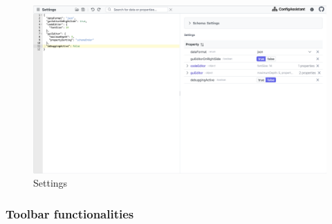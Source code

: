 \begin{figure}[h]
    \includegraphics[width=\textwidth]{figures/settings}
    \caption{Settings}
    \label{fig:settings}
\end{figure}

\subsubsection{Toolbar functionalities}

